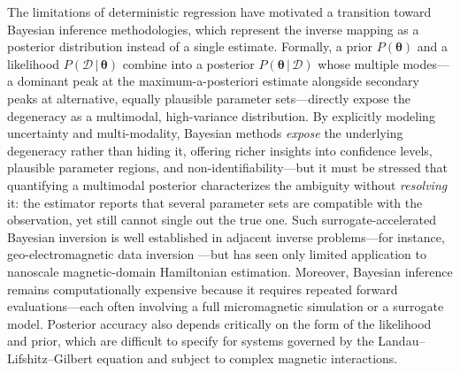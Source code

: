\documentclass[letterpaper, 12, one column]{article}
\begin{document}
The limitations of deterministic regression have motivated a transition toward Bayesian
inference methodologies, which represent the inverse mapping as a posterior
distribution instead of a single estimate. Formally, a prior $P(\boldsymbol{\theta})$ and a likelihood $P(\mathcal{D}\,|\,\boldsymbol{\theta})$ combine into a posterior $P(\boldsymbol{\theta}\,|\,\mathcal{D})$ whose multiple modes---a dominant peak at the maximum-a-posteriori estimate alongside secondary peaks at alternative, equally plausible parameter sets---directly expose the degeneracy as a multimodal, high-variance distribution. By explicitly modeling uncertainty and
multi-modality, Bayesian methods \emph{expose} the underlying degeneracy rather than hiding
it, offering richer insights into confidence levels, plausible parameter regions, and
non-identifiability---but it must be stressed that quantifying a multimodal posterior
characterizes the ambiguity without \emph{resolving} it: the estimator reports that several
parameter sets are compatible with the observation, yet still cannot single out the true one.
Such surrogate-accelerated Bayesian inversion is well established in adjacent inverse problems---for
instance, geo-electromagnetic data inversion \cite{Yang2024Bayesian}---but has seen only limited
application to nanoscale magnetic-domain Hamiltonian estimation.
Moreover, Bayesian inference remains computationally expensive because it
requires repeated forward evaluations—each often involving a full micromagnetic
simulation or a surrogate model. Posterior accuracy also depends critically on the form
of the likelihood and prior, which are difficult to specify for systems governed by the
Landau–Lifshitz–Gilbert equation and subject to complex magnetic interactions.
\end{document}
